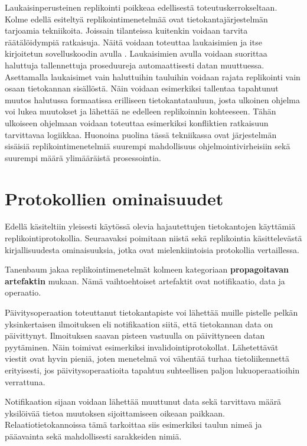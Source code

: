 \documentclass[finnish,twoside,censored,csm,sw-track-2018]{HYthesisML}
\begin{document}
Laukaisinperusteinen replikointi poikkeaa edellisestä toteutuskerrokseltaan. Kolme edellä esiteltyä replikointimenetelmää ovat tietokantajärjestelmän tarjoamia tekniikoita. Joissain tilanteissa kuitenkin voidaan tarvita räätälöidympiä ratkaisuja. Näitä voidaan toteuttaa laukaisimien ja itse kirjoitetun sovelluskoodin avulla \citep{Kleppmann}. Laukaisimien avulla voidaan suorittaa haluttuja tallennettuja proseduureja automaattisesti datan muuttuessa. Asettamalla laukaisimet vain haluttuihin tauluihin voidaan rajata replikointi vain osaan tietokannan sisällöstä. Näin voidaan esimerkiksi tallentaa tapahtunut muutos halutussa formaatissa erilliseen tietokantatauluun, josta ulkoinen ohjelma voi lukea muutokset ja lähettää ne edelleen replikoinnin kohteeseen. Tähän ulkoiseen ohjelmaan voidaan toteuttaa esimerkiksi konfliktien ratkaisuun tarvittavaa logiikkaa. Huonoina puolina tässä tekniikassa ovat järjestelmän sisäisiä replikointimenetelmiä suurempi mahdollisuus ohjelmointivirheisiin sekä suurempi määrä ylimääräistä prosessointia.

\section{Protokollien ominaisuudet}

Edellä käsiteltiin yleisesti käytössä olevia hajautettujen tietokantojen käyttämiä replikointiprotokollia. Seuraavaksi poimitaan niistä sekä replikointia käsittelevästä kirjallisuudesta ominaisuuksia, jotka ovat mielenkiintoisia protokollia vertaillessa.

Tanenbaum jakaa \citep{Tanenbaum} replikointimenetelmät kolmeen kategoriaan \textbf{propagoitavan artefaktin} mukaan. Nämä vaihtoehtoiset artefaktit ovat notifikaatio, data ja operaatio. 

Päivitysoperaation toteuttanut tietokantapiste voi lähettää muille pistelle pelkän yksinkertaisen ilmoituksen eli notifikaation siitä, että tietokannan data on päivittynyt. Ilmoituksen saavan pisteen vastuulla on päivittyneen datan pyytäminen. Näin toimivat esimerkiksi invalidointiprotokollat. Lähetettävät viestit ovat hyvin pieniä, joten menetelmä voi vähentää turhaa tietoliikennettä erityisesti, jos päivitysoperaatioita tapahtuu suhteellisen paljon lukuoperaatioihin verrattuna.
    
Notifikaation sijaan voidaan lähettää muuttunut data sekä tarvittava määrä yksilöivää tietoa muutoksen sijoittamiseen oikeaan paikkaan. Relaatiotietokannoissa tämä tarkoittaa siis esimerkiksi taulun nimeä ja pääavainta sekä mahdollisesti sarakkeiden nimiä. 
\end{document}
